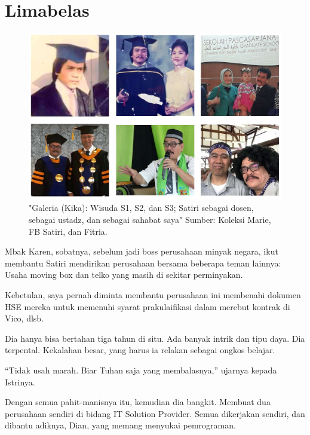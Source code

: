 
\chapter{Limabelas}

\begin{figure}[htbp]
\centerline{\includegraphics[scale=1.0]{01-15-01}}
\caption{"Galeria (Kika): Wisuda S1, S2, dan S3; Satiri sebagai dosen, sebagai ustadz, dan sebagai sahabat saya" Sumber: Koleksi Marie, FB Satiri, dan Fitria.}
\label{01-15-01}
\end{figure}
%

Mbak Karen, sobatnya, sebelum jadi boss perusahaan minyak negara, ikut membantu Satiri mendirikan perusahaan bersama beberapa teman lainnya: Usaha moving box dan telko yang masih di sekitar perminyakan.

Kebetulan, saya pernah diminta membantu perusahaan ini membenahi dokumen HSE mereka untuk memenuhi syarat prakulaifikasi dalam merebut kontrak di Vico, dlsb.

Dia hanya bisa bertahan tiga tahun di situ. Ada banyak intrik dan tipu daya. Dia terpental. Kekalahan besar, yang harus ia relakan sebagai ongkos belajar.

“Tidak usah marah. Biar Tuhan saja yang membalasnya,” ujarnya kepada Istrinya.

Dengan semua pahit-manisnya itu, kemudian dia bangkit. Membuat dua perusahaan sendiri di bidang IT Solution Provider. Semua dikerjakan sendiri, dan dibantu adiknya, Dian, yang memang menyukai pemrograman.

